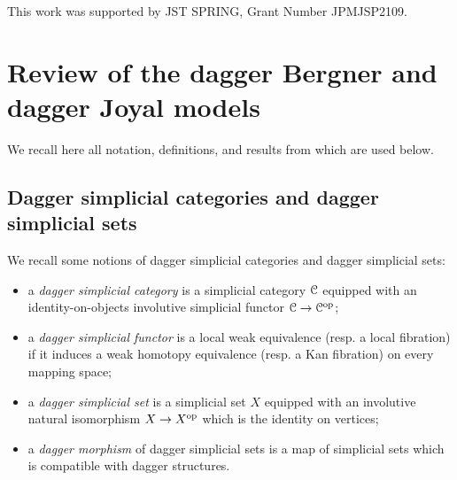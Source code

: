 \documentclass[a4paper,dvipdfmx,11pt]{amsart}
\begin{document}
This work was supported by JST SPRING, Grant Number JPMJSP2109. 


\section{Review of the dagger Bergner and dagger Joyal models}\label{review.section}

We recall here all notation, definitions, and results from \cite{Aka26} which are used below.

\subsection{Dagger simplicial categories and dagger simplicial sets}

\begin{definition}
  We recall some notions of dagger simplicial categories and dagger simplicial sets:
  \begin{itemize}
    \item a \emph{dagger simplicial category} is a simplicial category $\mathcal{C}$ equipped with an identity-on-objects involutive simplicial functor $\mathcal{C}\to\mathcal{C}^{\operatorname{op}}$;
    \item a \emph{dagger simplicial functor} is a local weak equivalence (resp. a local fibration) if it induces a weak homotopy equivalence (resp. a Kan fibration) on every mapping space;
    \item a \emph{dagger simplicial set} is a simplicial set $X$ equipped with an involutive natural isomorphism $X\to X^{\operatorname{op}}$ which is the identity on vertices;
    \item a \emph{dagger morphism} of dagger simplicial sets is a map of simplicial sets which is compatible with dagger structures.
  \end{itemize}
\end{definition}
\end{document}
